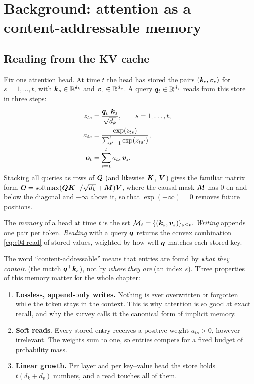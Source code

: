 \section{Background: attention as a content-addressable memory}\label{sec:c04-background}

\subsection{Reading from the KV cache}\label{sec:c04-cam}

Fix one attention head. At time $t$ the head has stored the pairs $(\bm{k}_s,\bm{v}_s)$ for
$s=1,\dots,t$, with $\bm{k}_s\in\mathbb{R}^{d_k}$ and $\bm{v}_s\in\mathbb{R}^{d_v}$. A query $\bm{q}_t\in\mathbb{R}^{d_k}$ reads
from this store in three steps:
\begin{align}
  z_{ts} &= \frac{\bm{q}_t^{\top}\bm{k}_s}{\sqrt{d_k}}, \qquad s = 1,\dots,t, \label{eq:c04-scores}\\
  a_{ts} &= \frac{\exp(z_{ts})}{\sum_{s'=1}^{t}\exp(z_{ts'})}, \label{eq:c04-weights}\\
  \bm{o}_t  &= \sum_{s=1}^{t} a_{ts}\,\bm{v}_s. \label{eq:c04-read}
\end{align}
Stacking all queries as rows of $\bm{Q}$ (and likewise $\bm{K}$, $\bm{V}$) gives the familiar matrix form
$\bm{O} = \operatorname{softmax}(\bm{Q}\bm{K}^{\top}/\sqrt{d_k} + \bm{M})\bm{V}$, where the causal mask $\bm{M}$ has $0$ on and
below the diagonal and $-\infty$ above it, so that $\exp(-\infty)=0$ removes future positions.

\begin{definition}\label{def:c04-cam}
The \emph{memory} of a head at time $t$ is the set $\mathcal{M}_t=\{(\bm{k}_s,\bm{v}_s)\}_{s\le t}$.
\emph{Writing} appends one pair per token. \emph{Reading} with a query $\bm{q}$ returns the
convex combination \eqref{eq:c04-read} of stored values, weighted by how well $\bm{q}$ matches
each stored key.
\end{definition}

The word ``content-addressable'' means that entries are found by \emph{what they contain} (the
match $\bm{q}^{\top}\bm{k}_s$), not by \emph{where they are} (an index $s$). Three properties of this
memory matter for the whole chapter:
\begin{enumerate}
  \item \textbf{Lossless, append-only writes.} Nothing is ever overwritten or forgotten while
  the token stays in the context. This is why attention is so good at exact recall, and why
  the survey calls it the canonical form of implicit memory.
  \item \textbf{Soft reads.} Every stored entry receives a positive weight $a_{ts}>0$, however
  irrelevant. The weights sum to one, so entries compete for a fixed budget of probability
  mass.
  \item \textbf{Linear growth.} Per layer and per key--value head the store holds
  $t(d_k+d_v)$ numbers, and a read touches all of them.
\end{enumerate}

